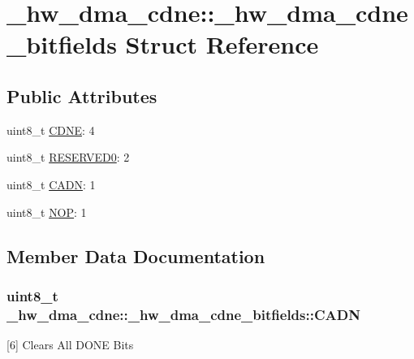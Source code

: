 \hypertarget{struct__hw__dma__cdne_1_1__hw__dma__cdne__bitfields}{}\section{\+\_\+hw\+\_\+dma\+\_\+cdne\+:\+:\+\_\+hw\+\_\+dma\+\_\+cdne\+\_\+bitfields Struct Reference}
\label{struct__hw__dma__cdne_1_1__hw__dma__cdne__bitfields}
\subsection*{Public Attributes}
\begin{DoxyCompactItemize}
\item 
uint8\+\_\+t \hyperlink{struct__hw__dma__cdne_1_1__hw__dma__cdne__bitfields_ab1ddbdeb8e607e1e1ff8afd236c93c61}{C\+D\+NE}\+: 4
\item 
uint8\+\_\+t \hyperlink{struct__hw__dma__cdne_1_1__hw__dma__cdne__bitfields_a099d2094bffd7a7e67393683434dcc49}{R\+E\+S\+E\+R\+V\+E\+D0}\+: 2
\item 
uint8\+\_\+t \hyperlink{struct__hw__dma__cdne_1_1__hw__dma__cdne__bitfields_adaa6783861db7308c981f3fb0b4a8663}{C\+A\+DN}\+: 1
\item 
uint8\+\_\+t \hyperlink{struct__hw__dma__cdne_1_1__hw__dma__cdne__bitfields_a2d0fc588f4e23aed9e119f61d7bb7bc4}{N\+OP}\+: 1
\end{DoxyCompactItemize}


\subsection{Member Data Documentation}
\subsubsection[{\texorpdfstring{C\+A\+DN}{CADN}}]{\setlength{\rightskip}{0pt plus 5cm}uint8\+\_\+t \+\_\+hw\+\_\+dma\+\_\+cdne\+::\+\_\+hw\+\_\+dma\+\_\+cdne\+\_\+bitfields\+::\+C\+A\+DN}\hypertarget{struct__hw__dma__cdne_1_1__hw__dma__cdne__bitfields_adaa6783861db7308c981f3fb0b4a8663}{}\label{struct__hw__dma__cdne_1_1__hw__dma__cdne__bitfields_adaa6783861db7308c981f3fb0b4a8663}
\mbox{[}6\mbox{]} Clears All D\+O\+NE Bits 
